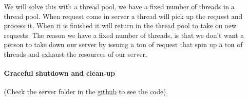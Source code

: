 We will solve this with a thread pool, we have a fixed number of threads in a thread pool. When request come in server a thread will pick up the request and process it. When it is finished it will return in the thread pool to take on new requests.
The reason we have a fixed number of threads, is that we don't want a person to take down our server by issuing a ton of request that spin up a ton of threads and exhaust the resources of our server.

\paragraph*{Graceful shutdown and clean-up}

(Check the server folder in the \href{https://github.com/razafy-rindra/the-rust-book/tree/main/server}{github} to see the code).

